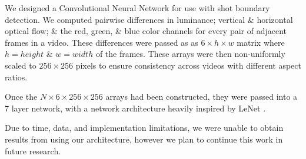 We designed a Convolutional Neural Network for use with shot boundary detection. We computed pairwise differences in luminance; vertical \& horizontal optical flow; \& the red, green, \& blue color channels for every pair of adjacent frames in a video. These differences were passed as as $6 \times h \times w$ matrix where $h = height$ \& $w = width$ of the frames. These arrays were then non-uniformly scaled to $256 \times 256$ pixels to ensure consistency across videos with different aspect ratios. 

Once the $N \times 6 \times 256 \times 256$ arrays had been constructed, they were passed into a 7 layer network, with a network architecture heavily inspired by LeNet \cite{lecun1998gradient}.

Due to time, data, and implementation limitations, we were unable to obtain results from using our architecture, however we plan to continue this work in future research. 


